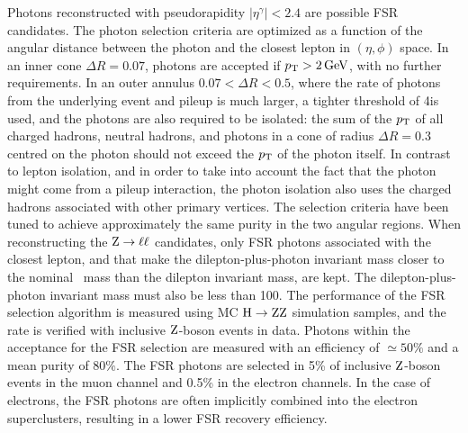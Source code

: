 \documentclass[11pt,twoside,a4paper,cmspaper,final,collab]{cms-tdr}
\begin{document}
Photons reconstructed with pseudorapidity  $\vert \eta^{\gamma} \vert < 2.4$ are possible FSR candidates.
The photon selection criteria are optimized as a function of the angular
distance between the photon and the closest lepton in $(\eta, \phi)$ space.
In an inner cone $\Delta R = 0.07$, photons are accepted if $p_{\mathrm{T}} > 2\,\text{Ge\hspace{-.08em}V}$,
with no further requirements. In an outer annulus $0.07< \Delta R<0.5$, where
the rate of photons from the underlying event and pileup
is much larger, a tighter threshold of 4\GeV is used, and the photons are also required to be isolated:
the sum of the $p_{\mathrm{T}} $ of all charged hadrons, neutral hadrons,
and photons in a cone of radius $\Delta R = 0.3$ centred on the photon should not exceed the $p_{\mathrm{T}} $
of the photon itself.
In contrast to lepton isolation,  and in order to take into account the fact that the photon might come
from a pileup interaction, the photon isolation also uses the charged hadrons associated with other
primary vertices.
The selection criteria have been tuned to achieve approximately the same purity in the two angular regions.
When reconstructing the $\mathrm{Z} \to \ell\ell $ candidates, only FSR photons associated with the closest
lepton, and that make the dilepton-plus-photon invariant mass closer to the nominal
\cPZ\ mass than the dilepton invariant mass, are kept. The dilepton-plus-photon invariant mass must also be less
than 100\GeV.
The performance of the FSR selection algorithm is measured using
MC $\mathrm{H} \to \mathrm{Z}\mathrm{Z} $  simulation samples, and the rate is verified
with inclusive $\mathrm{Z}$-boson  events in data.
Photons within the acceptance for the FSR selection are measured with an
efficiency of ${\simeq}50\%$ and a mean purity of $80\%$.
The FSR photons are selected in 5\% of  inclusive $\mathrm{Z}$-boson events
in the muon channel
and 0.5\% in the electron channels. In the case of electrons,
the FSR photons are often implicitly combined into the electron
superclusters, resulting in a lower FSR recovery efficiency.
\end{document}
